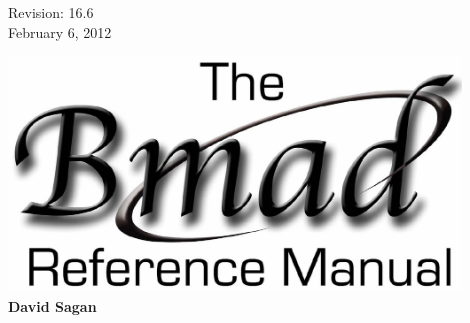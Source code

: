 \thispagestyle{empty}

\begin{flushright}
\large
  Revision: 16.6 \\
  February 6, 2012 \\
\end{flushright}

\vfill

{
\begin{center}
\includegraphics[width=12cm]{bmad-ref-manual.pdf} \\
\vskip 0.3in
\huge\bf David Sagan
\end{center}
}

\vfill
\break

